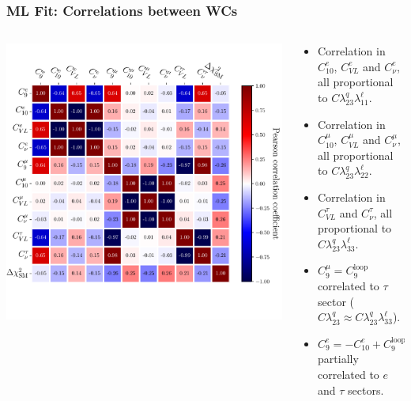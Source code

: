 \documentclass[mathserif, 10pt, dvipsnames]{beamer}
\begin{document}
\begin{frame}\frametitle{ML Fit: Correlations between WCs}

\begin{columns}[onlytextwidth]
\begin{column}{0.6\textwidth}
    \includegraphics[width=\columnwidth,clip]{figures/coeffcorr.pdf}

\end{column}
\begin{column}{0.4\textwidth}
\begin{itemize}
    \item Correlation in $C_{10}^e$, $C_{VL}^e$ and $C_\nu^e$, all proportional to $C \lambda^q_{23} \lambda^\ell_{11}$.
    \item Correlation in $C_{10}^\mu$, $C_{VL}^\mu$ and $C_\nu^\mu$, all proportional to $C \lambda^q_{23} \lambda^\ell_{22}$.
    \item Correlation in $C_{VL}^\tau$ and $C_\nu^\tau$, all proportional to $C \lambda^q_{23} \lambda^\ell_{33}$.
    \item $C_9^\mu = C_9^\mathrm{loop}$ correlated to $\tau$ sector ($C\lambda^q_{23} \approx C\lambda^q_{23} \lambda^\ell_{33}$).
    \item $C_9^e = -C_{10}^e + C_9^\mathrm{loop}$ partially correlated to $e$ and $\tau$ sectors.
\end{itemize}

\end{column}
\end{columns}
\end{frame}
\end{document}
